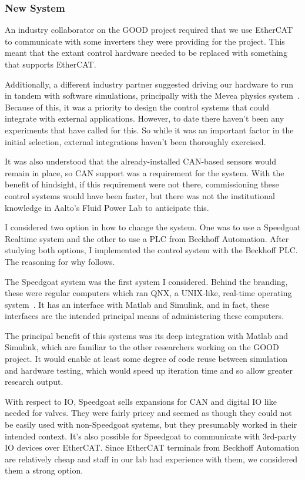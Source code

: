 \documentclass[english,12pt,a4paper,pdftex,eng,utf8]{aaltothesis}
\begin{document}
\subsubsection{New System}

An industry collaborator on the GOOD project required that we use EtherCAT~\cite{Andreeva2023} to communicate with some inverters they were providing for the project.  This meant that the extant control hardware needed to be replaced with something that supports EtherCAT.

Additionally, a different industry partner suggested driving our hardware to run in tandem with software simulations, principally with the Mevea physics system~\cite{MeveaSoftware}.  Because of this, it was a priority to design the control systems that could integrate with external applications.  However, to date there haven't been any experiments that have called for this.  So while it was an important factor in the initial selection, external integrations haven't been thoroughly exercised.

It was also understood that the already-installed CAN-based sensors would remain in place, so CAN support was a requirement for the system.  With the benefit of hindsight, if this requirement were not there, commissioning these control systems would have been faster, but there was not the institutional knowledge in Aalto's Fluid Power Lab to anticipate this.

I considered two option in how to change the system.  One was to use a Speedgoat Realtime system and the other to use a PLC from Beckhoff Automation.  After studying both options, I implemented the control system with the Beckhoff PLC.  The reasoning for why follows.

The Speedgoat system was the first system I considered.  Behind the branding, these were regular computers which ran QNX, a UNIX-like, real-time operating system~\cite{SpeedgoatMachine, QnxSdp}.  It has an interface with Matlab and Simulink, and in fact, these interfaces are the intended principal means of administering these computers.

The principal benefit of this systems was its deep integration with Matlab and Simulink, which are familiar to the other researchers working on the GOOD project.  It would enable at least some degree of code reuse between simulation and hardware testing, which would speed up iteration time and so allow greater research output.

With respect to IO, Speedgoat sells expansions for CAN and digital IO like needed for valves.  They were fairly pricey and seemed as though they could not be easily used with non-Speedgoat systems, but they presumably worked in their intended context.  It's also possible for Speedgoat to communicate with 3rd-party IO devices over EtherCAT.  Since EtherCAT terminals from Beckhoff Automation are relatively cheap and staff in our lab had experience with them, we considered them a strong option.
\end{document}
